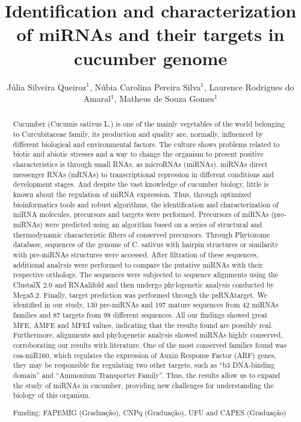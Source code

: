 \documentclass[twoside]{article}
\title{\vspace{-15mm}\fontsize{24pt}{10pt}\selectfont\textbf{Identification and characterization of miRNAs and their targets in cucumber genome}} %
\author{J\'ulia Silveira Queiroz$^1$, N\'ubia Carolina Pereira Silva$^1$, Laurence Rodrigues do Amaral$^1$, Matheus de Souza Gomes$^1$}
\affil{1 UFU\\ }
\date{}
\begin{document}
\maketitle %

\thispagestyle{fancy} %


\begin{abstract}
Cucumber (Cucumis sativus L.) is one of the mainly vegetables of the world belonging to Curcubitaceae family, its production and quality are, normally, influenced by different biological and environmental factors. The culture shows problems related to biotic and abiotic stresses and a way to change the organism to present positive characteristics is through small RNAs, as microRNAs (miRNAs). miRNAs direct messenger RNAs (mRNAs) to transcriptional repression in different conditions and development stages. And despite the vast knowledge of cucumber biology, little is known about the regulation of miRNA expression. Thus, through optimized bioinformatics tools and robust algorithms, the identification and characterization of miRNA molecules, precursors and targets were performed. Precursors of miRNAs (pre-miRNAs) were predicted using an algorithm based on a series of structural and thermodynamic characteristic filters of conserved precursors. Through Phytozome database, sequences of the genome of C. sativus with hairpin structures or similarity with pre-miRNAs structures were accessed. After filtration of these sequences, additional analysis were performed to compare the putative miRNAs with their respective orthologs. The sequences were subjected to sequence alignments using the ClustalX 2.0 and RNAalifold and then undergo phylogenetic analysis conducted by Mega5.2. Finally, target prediction was performed through the psRNAtarget. We identified in our study, 130 pre-miRNAs and 197 mature sequences from 42 miRNAs families and 87 targets from 98 different sequences. All our findings showed great MFE, AMFE and MFEI values, indicating that the results found are possibly real. Furthermore, alignments and phylogenetic analysis showed miRNAs highly conserved, corroborating our results with literature. One of the most conserved families found was csa-miR160, which regulates the expression of Auxin Response Factor (ARF) genes, they may be responsible for regulating two other targets, such as ``b3 DNA-binding domain'' and ``Ammonium Transporter Family''. Thus, the results allow us to expand the study of miRNAs in cucumber, providing new challenges for understanding the biology of this organism.

Funding: FAPEMIG (Gradua\c{c}\~ao), CNPq (Gradua\c{c}\~ao), UFU and CAPES (Gradua\c{c}\~ao)
\end{abstract}
\end{document}
